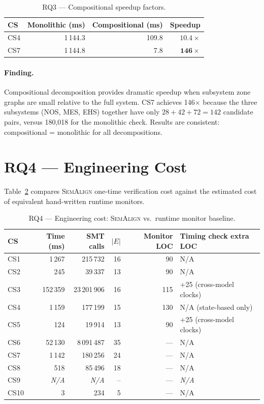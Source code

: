 \documentclass[10pt,a4paper]{article}
\newcommand{\NA}{\textcolor{notegray}{\textit{N/A}}}
\newcommand{\tool}{\textsc{SemAlign}}
\begin{document}
\begin{table}[htbp]
\centering
\caption{RQ3 — Compositional speedup factors.}
\label{tab:rq3_speedup}
\begin{tabular}{@{}lrrr@{}}
\toprule
\textbf{CS} & \textbf{Monolithic (ms)} & \textbf{Compositional (ms)} & \textbf{Speedup} \\
\midrule
CS4 & 1\,144.3 & 109.8 & $\mathbf{10.4\times}$ \\
CS7 & 1\,144.8 &   7.8 & $\mathbf{146\times}$ \\
\bottomrule
\end{tabular}
\end{table}

\paragraph{Finding.}
Compositional decomposition provides dramatic speedup when subsystem zone
graphs are small relative to the full system. CS7 achieves 146$\times$ because
the three subsystems (NOS, MES, EHS) together have only $28 + 42 + 72 = 142$
candidate pairs, versus 180{,}018 for the monolithic check. Results are
consistent: compositional = monolithic for all decompositions.

\section{RQ4 — Engineering Cost}

Table~\ref{tab:rq4} compares \tool{} one-time verification cost against
the estimated cost of equivalent hand-written runtime monitors.

\begin{table}[htbp]
\centering
\caption{RQ4 — Engineering cost: \tool{} vs.\ runtime monitor baseline.}
\label{tab:rq4}
\small
\begin{tabular}{@{}lrrrrl@{}}
\toprule
\textbf{CS} & \textbf{Time (ms)} & \textbf{SMT calls} & \textbf{$|E|$}
            & \textbf{Monitor LOC} & \textbf{Timing check extra LOC} \\
\midrule
CS1  &   1\,267 &  215\,732 & 16 &  90 & N/A \\
CS2  &     245  &   39\,337 & 13 &  90 & N/A \\
CS3  & 152\,359 & 23\,201\,906 & 16 & 115 & +25 (cross-model clocks) \\
CS4  &   1\,159 &  177\,199 & 15 & 130 & N/A (state-based only) \\
CS5  &     124  &   19\,914 & 13 &  90 & +25 (cross-model clocks) \\
CS6  &  52\,130 &  8\,091\,487 & 35 &  --- & N/A \\
CS7  &   1\,142 &  180\,256 & 24 &  --- & N/A \\
CS8  &     518  &   85\,496 & 18 &  --- & N/A \\
CS9  &   \NA    &       \NA & -- &  --- & \NA \\
CS10 &       3  &        234 &  5 &  --- & N/A \\
\bottomrule
\end{tabular}
\end{table}
\end{document}
